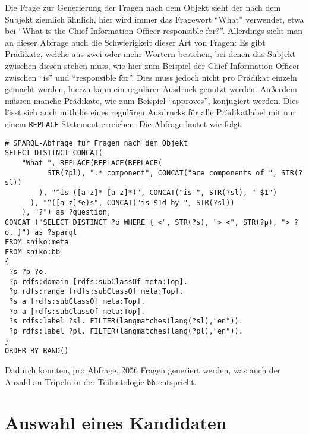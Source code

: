 Die Frage zur Generierung der Fragen nach dem Objekt sieht der nach dem Subjekt ziemlich ähnlich, hier wird immer das Fragewort \enquote{What} verwendet, etwa bei \enquote{What is the Chief Information Officer responsible for?}.
Allerdings sieht man an dieser Abfrage auch die Schwierigkeit dieser Art von Fragen:
Es gibt Prädikate, welche aus zwei oder mehr Wörtern bestehen, bei denen das Subjekt zwischen diesen stehen muss, wie hier zum Beispiel der Chief Information Officer zwischen \enquote{is} und \enquote{responsible for}.
Dies muss jedoch nicht pro Prädikat einzeln gemacht werden, hierzu kann ein regulärer Ausdruck genutzt werden.
Außerdem müssen manche Prädikate, wie zum Beispiel \enquote{approves}, konjugiert werden.
Dies lässt sich auch mithilfe eines regulären Ausdrucks für alle Prädikatlabel mit nur einem \texttt{REPLACE}-Statement erreichen.
Die Abfrage lautet wie folgt:
\begin{lstlisting}[language=SPARQL]
# SPARQL-Abfrage für Fragen nach dem Objekt
SELECT DISTINCT CONCAT(
    "What ", REPLACE(REPLACE(REPLACE(
          STR(?pl), ".* component", CONCAT("are components of ", STR(?sl))
        ), "^is ([a-z]* [a-z]*)", CONCAT("is ", STR(?sl), " $1")
      ), "^([a-z]*e)s", CONCAT("is $1d by ", STR(?sl))
    ), "?") as ?question,
CONCAT ("SELECT DISTINCT ?o WHERE { <", STR(?s), "> <", STR(?p), "> ?o. }") as ?sparql
FROM sniko:meta
FROM sniko:bb
{
 ?s ?p ?o.
 ?p rdfs:domain [rdfs:subClassOf meta:Top].
 ?p rdfs:range [rdfs:subClassOf meta:Top].
 ?s a [rdfs:subClassOf meta:Top].
 ?o a [rdfs:subClassOf meta:Top].
 ?s rdfs:label ?sl. FILTER(langmatches(lang(?sl),"en")).
 ?p rdfs:label ?pl. FILTER(langmatches(lang(?pl),"en")).
}
ORDER BY RAND()
\end{lstlisting}
Dadurch konnten, pro Abfrage, 2056 Fragen generiert werden, was auch der Anzahl an Tripeln in der Teilontologie \texttt{bb} entspricht.

\section{Auswahl eines Kandidaten}

